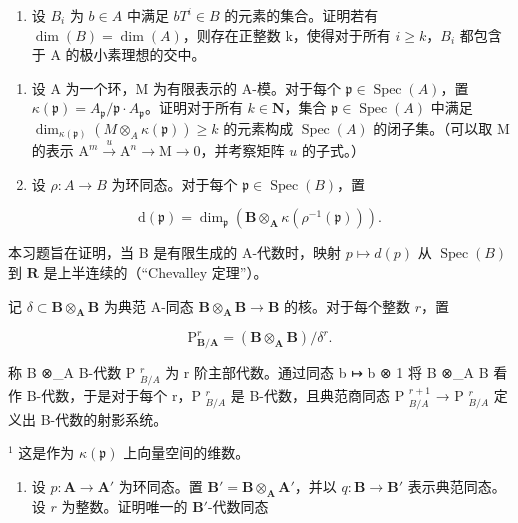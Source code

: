 \begin{enumerate}
\def\labelenumi{\alph{enumi})}
\setcounter{enumi}{1}
\tightlist
\item
  设 \(B_{i}\) 为 \(b \in A\) 中满足 \(bT^{i} \in B\) 的元素的集合。证明若有 \(\dim(B) = \dim(A)\)，则存在正整数 k，使得对于所有 \(i \geqslant k\)，\(B_{i}\) 都包含于 A 的极小素理想的交中。
\end{enumerate}

\begin{enumerate}
\def\labelenumi{\arabic{enumi})}
\setcounter{enumi}{8}
\item
  设 A 为一个环，M 为有限表示的 A-模。对于每个 \(\mathfrak{p} \in \operatorname{Spec}(A)\)，置 \(\kappa(\mathfrak{p}) = A_{\mathfrak{p}} / \mathfrak{p} \cdot A_{\mathfrak{p}}\)。证明对于所有 \(k \in \mathbf{N}\)，集合 \(\mathfrak{p} \in \operatorname{Spec}(A)\) 中满足 \(\dim_{\kappa(\mathfrak{p})} (M \otimes_A \kappa(\mathfrak{p})) \geqslant k\) 的元素构成 \(\operatorname{Spec}(A)\) 的闭子集。（可以取 M 的表示 \(\mathrm{A}^m \xrightarrow{u} \mathrm{A}^n \longrightarrow \mathrm{M} \longrightarrow 0\)，并考察矩阵 \(u\) 的子式。）
\item
  设 \(\rho: A \to B\) 为环同态。对于每个 \(\mathfrak{p} \in \operatorname{Spec}(B)\)，置
\end{enumerate}

\[
\mathrm{d} (\mathfrak {p}) = \dim_ {\mathfrak {p}} \left(\mathbf {B} \otimes_ {\mathbf {A}} \kappa \left(\rho^ {- 1} (\mathfrak {p})\right)\right).
\]

  本习题旨在证明，当 B 是有限生成的 A-代数时，映射 \(p \mapsto d(p)\) 从 \(\operatorname{Spec}(B)\) 到 \(\mathbf{R}\) 是上半连续的（“Chevalley 定理”）。

记 \(\delta \subset \mathbf{B} \otimes_{\mathbf{A}} \mathbf{B}\) 为典范 A-同态 \(\mathbf{B} \otimes_{\mathbf{A}} \mathbf{B} \to \mathbf{B}\) 的核。对于每个整数 \(r\)，置

\[
\mathrm{P} _ {\mathbf {B} / \mathbf {A}} ^ {r} = (\mathbf {B} \otimes_ {\mathbf {A}} \mathbf {B}) / \delta^ {r}.
\]

称 B ⊗\_A B-代数 P \(_{B/A}^{r}\) 为 r 阶主部代数。通过同态 b ↦ b ⊗ 1 将 B ⊗\_A B 看作 B-代数，于是对于每个 r，P \(_{B/A}^{r}\) 是 B-代数，且典范商同态 P \(_{B/A}^{r+1}\) → P \(_{B/A}^{r}\) 定义出 B-代数的射影系统。

\(^{1}\) 这是作为 \(\kappa(\mathfrak{p})\) 上向量空间的维数。

\begin{enumerate}
\def\labelenumi{\alph{enumi})}
\tightlist
\item
  设 \(p: \mathbf{A} \to \mathbf{A}'\) 为环同态。置 \(\mathbf{B}' = \mathbf{B} \otimes_{\mathbf{A}} \mathbf{A}'\)，并以 \(q: \mathbf{B} \to \mathbf{B}'\) 表示典范同态。设 \(r\) 为整数。证明唯一的 \(\mathbf{B}'\)-代数同态
\end{enumerate}


